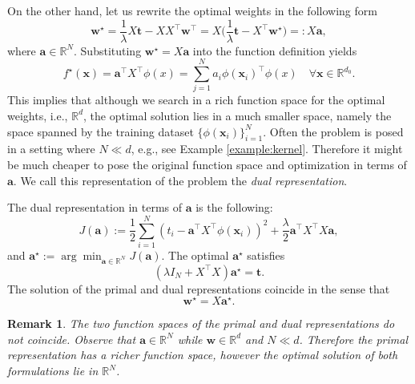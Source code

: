 \documentclass[11pt]{article}
\newcommand{\w}{\textbf{w}}
\newcommand{\x}{\textbf{x}}
\newcommand{\R}{\mathbb{R}}
\newcommand{\bo}[1]{{\mathbf #1}}
\newtheorem{remark}{Remark}[section]
\begin{document}
On the other hand, let us rewrite the optimal weights in the following form
\begin{equation}
  \w^\star = \frac{1}{\lambda} X \bo{t} - X X^\top \w^\top
  = X \Big( \frac{1}{\lambda} \bo{t} - X^\top \w^\star \Big) =: X \bo{a},
\end{equation}
where $\bo{a} \in \R^{N}$. Substituting $\w^\star = X \bo{a}$ into
the function definition yields
\begin{equation}
  f^\star(\x) = \bo{a}^\top X^\top \phi(x) = \sum_{j=1}^{N} a_i
  \phi(\x_i)^\top \phi(x) \quad \forall \x \in \R^{d_0}.
\end{equation}
This implies that although we search in a rich function space for the
optimal weights, i.e., $\R^d$, the optimal solution lies in a much
smaller space, namely the space spanned by the training dataset
$\{\phi(\x_i)\}_{i=1}^{N}$. Often the problem is posed in a setting
where $N \ll d$, e.g., see Example \ref{example:kernel}. Therefore it
might be much cheaper to pose the original function space and
optimization in terms of $\bo{a}$. We call this representation of the
problem the {\it dual representation}.

The dual representation in terms of $\bo{a}$ is the following:
\begin{equation}
  J(\bo{a}) := \frac12 \sum_{i=1}^{N} (t_i -
  \bo{a}^\top X^\top  \phi(\x_i))^2 +
  \frac{\lambda}{2} \bo{a}^\top X^\top X \bo{a},
\end{equation}
and $\bo{a}^\star := \arg\min_{\bo{a}\in\R^N} J(\bo{a})$.
The optimal $\bo{a}^\star$ satisfies
\begin{equation}
  (\lambda I_N + X^\top X) \bo{a}^\star = \bo{t}.
\end{equation}
The solution of the primal and dual representations coincide in the
sense that
\begin{equation}
  \bo{w}^\star = X \bo{a}^\star.
\end{equation}
\begin{remark}
  The two function spaces of the primal and dual representations do
  not coincide. Observe that $\bo{a}\in\R^N$ while $\w \in \R^d$ and
  $N \ll d$. Therefore the primal representation has a richer function
  space, however the optimal solution of both formulations lie in $\R^N$.
\end{remark}
\end{document}
